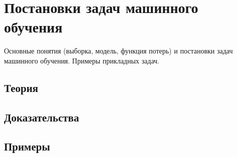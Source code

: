 
\section{Постановки задач машинного обучения}
\label{sec:1.4.01-ml-foundations}

\begin{ticket}
Основные понятия (выборка, модель, функция потерь) и постановки задач машинного обучения. Примеры прикладных задач.
\end{ticket}

\subsection*{Теория}

\subsection*{Доказательства}

\subsection*{Примеры}
